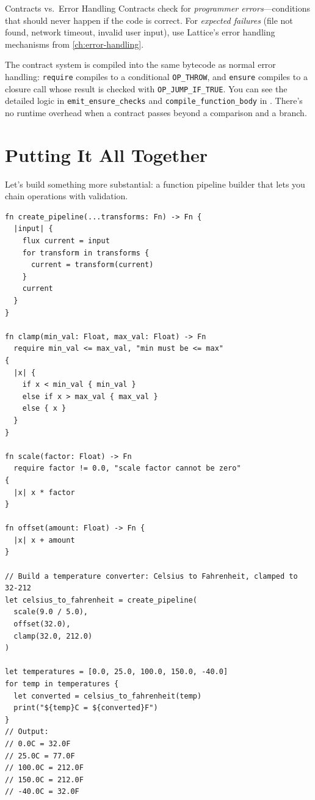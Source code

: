 \begin{tipbox}{Contracts vs.\ Error Handling}
Contracts check for \emph{programmer errors}---conditions that should never happen if the code is correct. For \emph{expected failures} (file not found, network timeout, invalid user input), use Lattice's error handling mechanisms from \cref{ch:error-handling}.
\end{tipbox}

The contract system is compiled into the same bytecode as normal error handling: \lstinline|require| compiles to a conditional \lstinline|OP_THROW|, and \lstinline|ensure| compiles to a closure call whose result is checked with \lstinline|OP_JUMP_IF_TRUE|. You can see the detailed logic in \texttt{emit\_ensure\_checks} and \texttt{compile\_function\_body} in . There's no runtime overhead when a contract passes beyond a comparison and a branch.

\section{Putting It All Together}\label{sec:functions-together}

Let's build something more substantial: a function pipeline builder that lets you chain operations with validation.

\begin{lstlisting}[language=Lattice, caption={A validated pipeline builder}]
fn create_pipeline(...transforms: Fn) -> Fn {
  |input| {
    flux current = input
    for transform in transforms {
      current = transform(current)
    }
    current
  }
}

fn clamp(min_val: Float, max_val: Float) -> Fn
  require min_val <= max_val, "min must be <= max"
{
  |x| {
    if x < min_val { min_val }
    else if x > max_val { max_val }
    else { x }
  }
}

fn scale(factor: Float) -> Fn
  require factor != 0.0, "scale factor cannot be zero"
{
  |x| x * factor
}

fn offset(amount: Float) -> Fn {
  |x| x + amount
}

// Build a temperature converter: Celsius to Fahrenheit, clamped to 32-212
let celsius_to_fahrenheit = create_pipeline(
  scale(9.0 / 5.0),
  offset(32.0),
  clamp(32.0, 212.0)
)

let temperatures = [0.0, 25.0, 100.0, 150.0, -40.0]
for temp in temperatures {
  let converted = celsius_to_fahrenheit(temp)
  print("${temp}C = ${converted}F")
}
// Output:
// 0.0C = 32.0F
// 25.0C = 77.0F
// 100.0C = 212.0F
// 150.0C = 212.0F
// -40.0C = 32.0F
\end{lstlisting}

